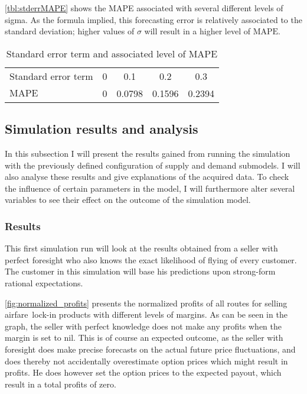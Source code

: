 \autoref{tbl:stderrMAPE} shows the MAPE associated with several different levels of sigma. As the formula implied, this forecasting error is relatively associated to the standard deviation; higher values of $\sigma$ will result in a higher level of $\mbox{MAPE}$.


\begin{table}
\centering
\begin{tabular}{l c c c c}
\toprule

Standard error term  &  0  &  0.1  &  0.2  &  0.3  \\
$\mbox{MAPE}$        &  0  &  0.0798  &  0.1596  &  0.2394  \\
\bottomrule
\end{tabular}
\caption{Standard error term and associated level of MAPE}
\label{tbl:stderrMAPE}
\end{table}


\subsection{Simulation results and analysis}
In this subsection I will present the results gained from running the simulation with the previously defined configuration of supply and demand submodels. I will also analyse these results and give explanations of the acquired data. To check the influence of certain parameters in the model, I will furthermore alter several variables to see their effect on the outcome of the simulation model.

\subsubsection{Results}
This first simulation run will look at the results obtained from a seller with perfect foresight who also knows the exact likelihood of flying of every customer. The customer in this simulation will base his predictions upon strong-form rational expectations.

\autoref{fig:normalized_profits} presents the normalized profits of all routes for selling airfare~lock-in products with different levels of margins. As can be seen in the graph, the seller with perfect knowledge does not make any profits when the margin is set to nil. This is of course an expected outcome, as the seller with foresight does make precise forecasts on the actual future price fluctuations, and does thereby not accidentally overestimate option prices which might result in profits. He does however set the option prices to the expected payout, which result in a total profits of zero.

